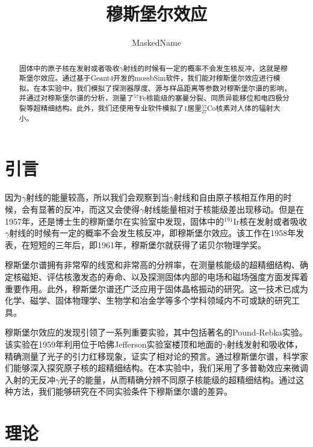\documentclass[font=default]{mpltx}
\begin{document}
\title{穆斯堡尔效应} %
\author{MaskedName} %
\date{}
\begin{abstract}
固体中的原子核在发射或者吸收$\gamma$射线的时候有一定的概率不会发生核反冲，这就是穆斯堡尔效应。通过基于Geant4开发的mossbSim软件，我们能对穆斯堡尔效应进行模拟。在本实验中，我们模拟了探测器厚度、源与样品距离等参数对穆斯堡尔谱的影响，并通过对穆斯堡尔谱的分析，测量了$^{57}$Fe核能级的塞曼分裂、同质异能移位和电四极分裂等超精细结构。此外，我们还使用专业软件模拟了1居里$_{27}^{57}$Co核素对人体的辐射大小。
\end{abstract}

\maketitle

\section{引言}
因为$\gamma$射线的能量较高，所以我们会观察到当$\gamma$射线和自由原子核相互作用的时候，会有显著的反冲，而这又会使得$\gamma$射线能量相对于核能级差出现移动。但是在1957年，还是博士生的穆斯堡尔在实验室中发现，固体中的$^{191}$Ir核在发射或者吸收$\gamma$射线的时候有一定的概率不会发生核反冲，即穆斯堡尔效应。该工作在1958年发表，在短短的三年后，即1961年，穆斯堡尔就获得了诺贝尔物理学奖。

穆斯堡尔谱拥有非常窄的线宽和非常高的分辨率，在测量核能级的超精细结构、确定核磁矩、评估核激发态的寿命、以及探测固体内部的电场和磁场强度方面发挥着重要作用。此外，穆斯堡尔谱还广泛应用于固体晶格振动的研究。这一技术已成为化学、磁学、固体物理学、生物学和冶金学等多个学科领域内不可或缺的研究工具。

穆斯堡尔效应的发现引领了一系列重要实验，其中包括著名的Pound-Rebka实验。该实验在1959年利用位于哈佛Jefferson实验室楼顶和地面的$\gamma$射线发射和吸收体，精确测量了光子的引力红移现象，证实了相对论的预言\cite{pound-rebka}。通过穆斯堡尔谱，科学家们能够深入探究原子核的超精细结构。在本实验中，我们采用了多普勒效应来微调入射的无反冲$\gamma$光子的能量，从而精确分辨不同原子核能级的超精细结构。通过这种方法，我们能够研究在不同实验条件下穆斯堡尔谱的差异。

\section{理论}
\end{document}
